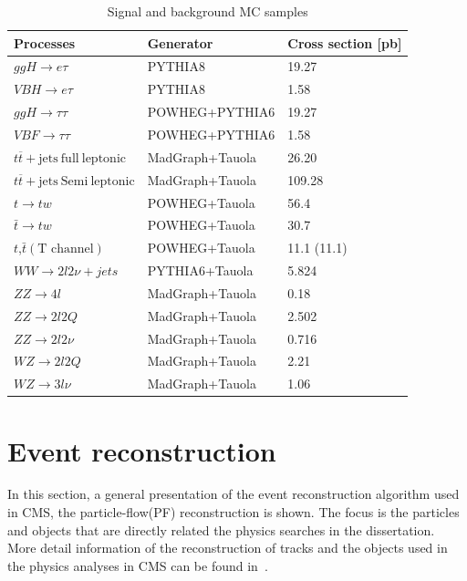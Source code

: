 \begin{table}[hbtp]
 \begin{center}
  \caption{Signal and background MC samples}
  \label{tab:mcdatasets}
  \begin{tabular}{l|l|l}
Processes & Generator & Cross section [pb] \\\hline
$ggH\to e\tau $     &          PYTHIA8                     &  19.27                \\\hline
$VBH\to e\tau$     &          PYTHIA8                      &   1.58                \\  \hline
$ggH \to \tau\tau$ &POWHEG+PYTHIA6              &  19.27           \\\hline
 $VBF\to\tau\tau$  &POWHEG+PYTHIA6              &   1.58           \\  \hline
$t\overline{t}+\textrm{jets}~ \textrm{full}~\textrm{leptonic}$  &  MadGraph+Tauola                &  26.20                \\\hline
$t\overline{t}+\textrm{jets}~\textrm{Semi}~\textrm{leptonic}$   & MadGraph+Tauola           &  109.28               \\ \hline
$t \to tw$              &   POWHEG+Tauola     &    56.4 \\\hline
$\bar{t} \to tw$              &   POWHEG+Tauola     &    30.7 \\\hline
$t$,$\bar{t}(\textrm{T channel})$           & POWHEG+Tauola        &   11.1 (11.1)          \\ \hline
$WW \to 2l2\nu+jets$    & PYTHIA6+Tauola                  & 5.824\\ \hline
$ZZ\to 4l$               & MadGraph+Tauola                 & 0.18                  \\  \hline
$ZZ\to 2l2Q$             &MadGraph+Tauola              &   2.502               \\  \hline
$ZZ\to 2l2\nu$           &MadGraph+Tauola              &    0.716              \\  \hline
$WZ\to 2l2Q$             &MadGraph+Tauola                &    2.21               \\  \hline
$WZ\to 3l\nu$            &MadGraph+Tauola           & 1.06                  \\  \hline
  \end{tabular}
 \end{center}
\end{table}





\section{Event reconstruction}
In this section, a general presentation of the event reconstruction algorithm used in CMS, the particle-flow(PF) reconstruction is shown. The focus is the particles and objects that are directly related the physics searches in the dissertation. More detail information of the reconstruction of tracks and the objects  used in the physics analyses in CMS can be found in~\cite{CMS-PRF-14-001}.  
